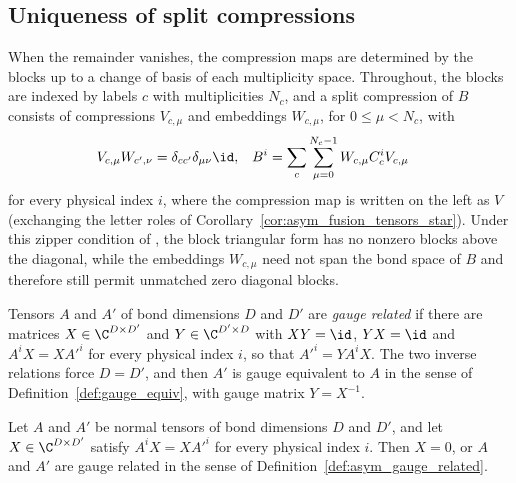 \subsection{Uniqueness of split compressions}%
\label{sec:asym_zipper_uniqueness}

When the remainder vanishes, the compression maps are determined by the blocks
up to a change of basis of each multiplicity space. Throughout, the blocks are
indexed by labels $c$ with multiplicities $N_c$, and a split compression of $B$
consists of compressions $V_{c,\mu}$ and embeddings $W_{c,\mu}$, for
$0\leq\mu<N_c$, with
\begin{align}
    V_{c,\mu}W_{c',\nu} & =\delta_{cc'}\delta_{\mu\nu}\id,                   &
    B^i                 & =\sum_c\sum_{\mu=0}^{N_c-1}W_{c,\mu}C_c^iV_{c,\mu}
    \label{eq:asym_zipper_decomposition}
\end{align}
for every physical index $i$, where the compression map is written on the
left as $V$ (exchanging the letter roles of
Corollary~\ref{cor:asym_fusion_tensors_star}). Under this zipper condition of
\cite{Bultinck2017Anyons}, the block triangular form has no nonzero blocks
above the diagonal, while the embeddings $W_{c,\mu}$ need not span the bond
space of $B$ and therefore still permit unmatched zero diagonal blocks.

\begin{definition}
    \label{def:asym_gauge_related}
    \leanok
    Tensors $A$ and $A'$ of bond dimensions $D$ and $D'$ are
    \emph{gauge related} if there are matrices $X\in\C^{D\times D'}$ and
    $Y\in\C^{D'\times D}$ with $XY=\id$, $YX=\id$ and $A^iX=XA'^i$ for every
    physical index $i$, so that $A'^i=YA^iX$. The two inverse relations force
    $D=D'$, and then $A'$ is gauge equivalent to $A$ in the sense of
    Definition~\ref{def:gauge_equiv}, with gauge matrix $Y=X^{-1}$.
\end{definition}

\begin{lemma}
    \label{lem:asym_normal_intertwiner}
    \leanok
    Let $A$ and $A'$ be normal tensors of bond dimensions $D$ and $D'$, and
    let $X\in\C^{D\times D'}$ satisfy $A^iX=XA'^i$ for every physical index
    $i$. Then $X=0$, or $A$ and $A'$ are gauge related in the sense of
    Definition~\ref{def:asym_gauge_related}.
\end{lemma}

